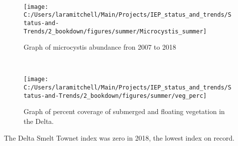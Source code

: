 \documentclass[
]{book}
\begin{document}
\begin{panel-grid}
\begin{columns-nocenter}
\begin{column40}

~

\end{column40}

\begin{column800}

\begin{expand}

\begin{figure}
\texttt{[image: C:/Users/laramitchell/Main/Projects/IEP\_status\_and\_trends/Status-and-Trends/2\_bookdown/figures/summer/Microcystis\_summer]} \caption{Graph of microcystis abundance fron 2007 to 2018}\label{fig:unnamed-chunk-89}
\end{figure}

\end{expand}

\end{column800}

\begin{column40}

~

\end{column40}

\begin{column800}

\begin{expand}

\begin{figure}
\texttt{[image: C:/Users/laramitchell/Main/Projects/IEP\_status\_and\_trends/Status-and-Trends/2\_bookdown/figures/summer/veg\_perc]} \caption{Graph of percent coverage of submerged and floating vegetation in the Delta.}\label{fig:unnamed-chunk-90}
\end{figure}

\end{expand}

\end{column800}

\end{columns-nocenter}

\begin{columns-nocenter}

\begin{column800}

The Delta Smelt Townet index was zero in 2018, the lowest index on record.

\end{column800}

\begin{column40}


\end{column40}
\end{columns-nocenter}
\end{panel-grid}
\end{document}
